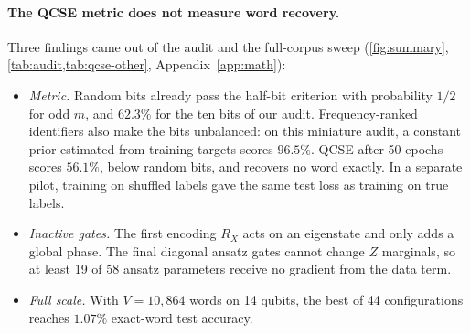 \documentclass[11pt,a4paper]{article}
\begin{document}
\paragraph{The QCSE metric does not measure word recovery.}
Three findings came out of the audit and the full-corpus sweep (\cref{fig:summary}, \cref{tab:audit,tab:qcse-other}, Appendix~\ref{app:math}):
\begin{itemize}
  \item \emph{Metric.} Random bits already pass the half-bit criterion with probability $1/2$ for odd $m$, and $62.3\%$ for the ten bits of our audit. Frequency-ranked identifiers also make the bits unbalanced: on this miniature audit, a constant prior estimated from training targets scores $96.5\%$. QCSE after 50 epochs scores $56.1\%$, below random bits, and recovers no word exactly. In a separate pilot, training on shuffled labels gave the same test loss as training on true labels.
  \item \emph{Inactive gates.} The first encoding $R_X$ acts on an eigenstate and only adds a global phase. The final diagonal ansatz gates cannot change $Z$ marginals, so at least 19 of 58 ansatz parameters receive no gradient from the data term.
  \item \emph{Full scale.} With $V=10{,}864$ words on 14 qubits, the best of 44 configurations reaches $1.07\%$ exact-word test accuracy.
\end{itemize}
\end{document}
